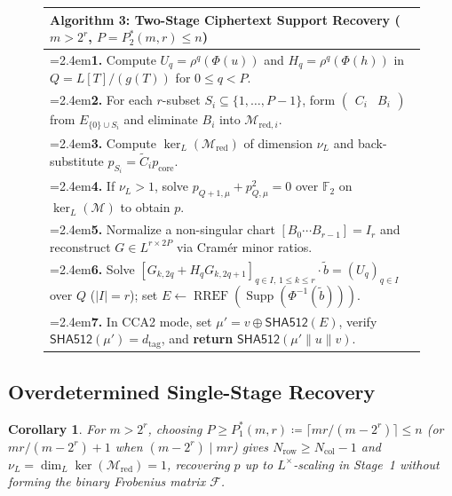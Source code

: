 \documentclass[11pt,a4paper]{article}
\newtheorem{corollary}[theorem]{Corollary}
\theoremstyle{definition}
\theoremstyle{remark}
\newcommand{\Ftwo}{\mathbb{F}_2}
\newcommand{\Supp}{\operatorname{Supp}}
\newcommand{\RREF}{\operatorname{RREF}}
\newcommand{\SHA}{\mathsf{SHA512}}
\newcommand{\algstep}[2]{\hangindent=2.4em\hangafter=1\hspace*{1.1em}\textbf{#1.} #2}
\begin{document}
\begin{figure}[t]
\centering
\renewcommand{\arraystretch}{1.12}
\begin{tabular}{@{}>{\raggedright\arraybackslash}p{\textwidth}@{}}
\toprule
\textbf{Algorithm 3:} Two-Stage Ciphertext Support Recovery ($m > 2^r$, $P = P_2^*(m,r) \le n$) \\
\midrule
\algstep{1}{Compute $U_q = \rho^q(\Phi(u))$ and $H_q = \rho^q(\Phi(h))$ in $Q = L[T]/(g(T))$ for $0 \le q < P$.} \\
\algstep{2}{For each $r$-subset $S_i \subseteq \{1, \dots, P-1\}$, form $\begin{pmatrix} C_i & B_i \end{pmatrix}$ from $E_{\{0\} \cup S_i}$ and eliminate $B_i$ into $\mathcal{M}_{\text{red}, i}$.} \\
\algstep{3}{Compute $\ker_L(\mathcal{M}_{\text{red}})$ of dimension $\nu_L$ and back-substitute $p_{S_i} = \widetilde{C}_i p_{\text{core}}$.} \\
\algstep{4}{If $\nu_L > 1$, solve $p_{Q+1,\mu} + p_{Q,\mu}^2 = 0$ over $\Ftwo$ on $\ker_L(\mathcal{M})$ to obtain $p$.} \\
\algstep{5}{Normalize a non-singular chart $[B_0 \cdots B_{r-1}] = I_r$ and reconstruct $G \in L^{r \times 2P}$ via Cram\'{e}r minor ratios.} \\
\algstep{6}{Solve $[G_{k, 2q} + H_q G_{k, 2q+1}]_{q \in I,\, 1 \le k \le r} \cdot \tilde{b} = (U_q)_{q \in I}$ over $Q$ ($|I|=r$); set $E \leftarrow \RREF(\Supp(\Phi^{-1}(\tilde{b})))$.} \\
\algstep{7}{In CCA2 mode, set $\mu' = v \oplus \SHA(E)$, verify $\SHA(\mu') = d_{\text{tag}}$, and \textbf{return} $\SHA(\mu' \parallel u \parallel v)$.} \\
\bottomrule
\end{tabular}
\end{figure}

\subsection{Overdetermined Single-Stage Recovery}
\label{subsec:ct-overdet}

\begin{corollary}
\label{cor:p1-star}
For $m > 2^r$, choosing $P \ge P_1^*(m, r) \coloneqq \lceil m r / (m - 2^r) \rceil \le n$ (or $m r / (m - 2^r) + 1$ when $(m - 2^r) \mid m r$) gives $N_{\text{row}} \ge N_{\text{col}} - 1$ and $\nu_L = \dim_L \ker(\mathcal{M}_{\text{red}}) = 1$, recovering $p$ up to $L^\times$-scaling in Stage~1 without forming the binary Frobenius matrix $\mathcal{F}$.
\end{corollary}
\end{document}
